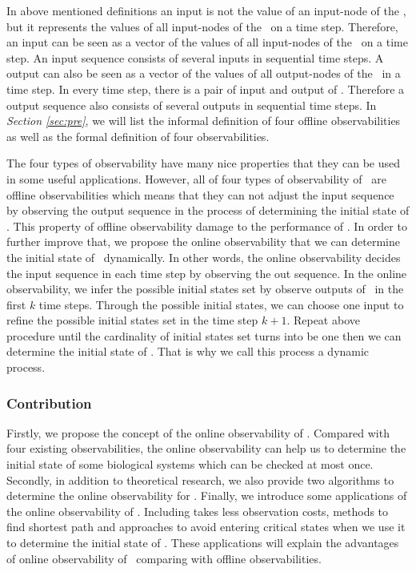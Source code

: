 
In above mentioned definitions an input is not the value of an input-node of the \BCN, but it represents the values of all input-nodes of the \BCN\ on a time step. Therefore, an input can be seen as a vector of the values of all input-nodes of the \BCN\ on a time step. An input sequence consists of several inputs in sequential time steps.
     A output can also be seen as a vector of the values of all output-nodes of the \BCN\ in a time step. In every time step, there is a pair of input and output of \BCN. Therefore a output sequence also consists of several outputs in sequential time steps. In {\em Section \ref{sec:pre}}, we will list the informal definition of four offline  observabilities as well as the formal definition of four observabilities.%


The four  types of observability  have many nice properties that they can be used in some useful applications. However, all of four  types of observability of \BCNs\ are offline observabilities which means that they can not adjust the input sequence by observing the output sequence in the process of determining the initial state of \BCNs. This property of offline observability damage to the performance of \BCNs. In order to further improve that, we propose the online observability that we can determine the initial state of \BCNs\ dynamically. In other words,  the online observability decides the input sequence in each time step by observing the out sequence. In the  online observability, we infer the possible  initial states set by observe outputs of \BCN\ in the first $k$ time steps. Through the  possible  initial states, we can choose one input to refine the possible initial states set in the time step $k+1$. Repeat above procedure until the cardinality of initial states set turns into be one then we can determine the initial state of \BCNs. That is why we call this process a dynamic process. 

\subsubsection*{Contribution}
Firstly, we propose the concept of the online observability of \BCNs. Compared with four existing observabilities, the online observability can help us to determine the initial state of some biological systems which can be checked at most once. Secondly, in addition to theoretical research, we also provide two algorithms to determine the online observability for \BCNs. Finally, we introduce some applications of the online observability of \BCNs. Including takes less observation costs, methods to find shortest path and approaches to avoid entering critical states when we use it to determine the initial state of \BCNs.  These applications will explain the advantages of online observability of \BCNs\ comparing with offline observabilities. %
